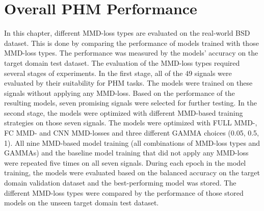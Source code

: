 \section{Overall PHM Performance}\label{ch:PHM_performance}
In this chapter, different MMD-loss types are evaluated on the real-world BSD dataset. This is done by comparing the performance of models trained with those MMD-loss types. The performance was measured by the models' accuracy on the target domain test dataset. The evaluation of the MMD-loss types required several stages of experiments.
In the first stage, all of the 49 signals were evaluated by their suitability for PHM tasks. The models were trained on these signals without applying any MMD-loss. Based on the performance of the resulting models, seven promising signals were selected for further testing. In the second stage, the models were optimized with different MMD-based training strategies on those seven signals. The models were optimized with FULL MMD-, FC MMD- and CNN MMD-losses and three different GAMMA choices (0.05, 0.5, 1). All nine MMD-based model training (all combinations of MMD-loss types and GAMMAs) and the baseline model training that did not apply any MMD-loss were repeated five times on all seven signals. During each epoch in the model training, the models were evaluated based on the balanced accuracy on the target domain validation dataset and the best-performing model was stored. The different MMD-loss types were compared by the performance of those stored models on the unseen target domain test dataset.


